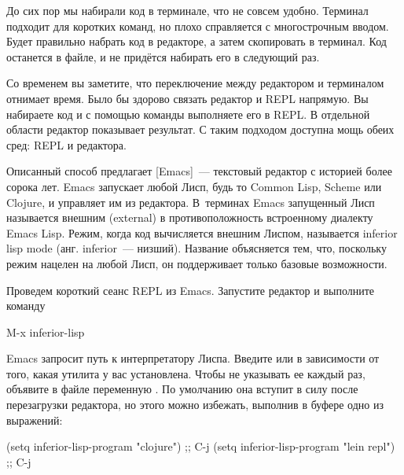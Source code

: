 
До сих пор мы набирали код в терминале, что не совсем удобно. Терминал подходит для коротких команд, но плохо справляется с многострочным вводом. Будет правильно набрать код в редакторе, а затем скопировать в терминал. Код останется в файле, и не придётся набирать его в следующий раз.

Со временем вы заметите, что переключение между редактором и терминалом отнимает время. Было бы здорово связать редактор и REPL напрямую. Вы набираете код и с помощью команды выполняете его в REPL. В отдельной области редактор показывает результат. С таким подходом доступна мощь обеих сред: REPL и редактора.


\def\urlemacs{https://www.gnu.org/software/emacs/}

Описанный способ предлагает \footurl{Emacs}{\urlemacs}[Emacs]~--- текстовый редактор с историей более сорока лет. Emacs запускает любой Лисп, будь то Common Lisp, Scheme или Clojure, и управляет им из редактора. В~терминах Emacs запущенный Лисп называется внешним (external) в противоположность встроенному диалекту Emacs Lisp. Режим, когда код вычисляется внешним Лиспом, называется inferior lisp mode (анг. inferior~--- низший). Название объясняется тем, что, поскольку режим нацелен на любой Лисп, он поддерживает только базовые возможности.

Проведем короткий сеанс REPL из Emacs. Запустите редактор и выполните команду


\begin{english}
  \begin{text}
M-x inferior-lisp
  \end{text}
\end{english}

Emacs запросит путь к интерпретатору Лиспа. Введите  или  в зависимости от того, какая утилита у вас установлена. Чтобы не указывать ее каждый раз, объявите в файле  переменную . По умолчанию она вступит в силу после перезагрузки редактора, но этого можно избежать, выполнив в буфере  одно из выражений:

\begin{english}
  \begin{lisp}
(setq inferior-lisp-program "clojure") ;; C-j
(setq inferior-lisp-program "lein repl") ;; C-j
  \end{lisp}
\end{english}

